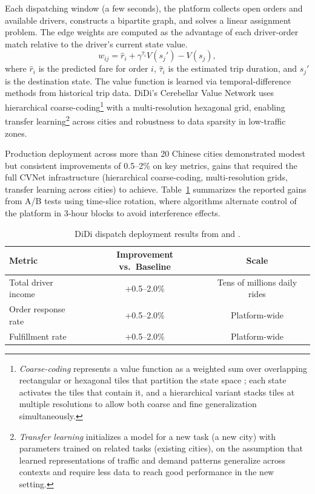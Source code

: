 Each dispatching window (a few seconds), the platform collects open orders and available drivers, constructs a bipartite graph, and solves a linear assignment problem. The edge weights are computed as the advantage of each driver-order match relative to the driver's current state value.
\begin{equation}
w_{ij} = \hat{r}_i + \gamma^{\hat{\tau}_i} V(s_j') - V(s_j),
\end{equation}
where $\hat{r}_i$ is the predicted fare for order $i$, $\hat{\tau}_i$ is the estimated trip duration, and $s_j'$ is the destination state. The value function is learned via temporal-difference methods from historical trip data. DiDi's Cerebellar Value Network \citep[CVNet;][]{Tang2019cvnet} uses hierarchical coarse-coding\footnote{\emph{Coarse-coding} represents a value function as a weighted sum over overlapping rectangular or hexagonal tiles that partition the state space \citep{sutton2018}; each state activates the tiles that contain it, and a hierarchical variant stacks tiles at multiple resolutions to allow both coarse and fine generalization simultaneously.} with a multi-resolution hexagonal grid, enabling transfer learning\footnote{\emph{Transfer learning} initializes a model for a new task (a new city) with parameters trained on related tasks (existing cities), on the assumption that learned representations of traffic and demand patterns generalize across contexts and require less data to reach good performance in the new setting.} across cities and robustness to data sparsity in low-traffic zones.

Production deployment across more than 20 Chinese cities demonstrated modest but consistent improvements of 0.5--2\% on key metrics, gains that required the full CVNet infrastructure (hierarchical coarse-coding, multi-resolution grids, transfer learning across cities) to achieve. Table~\ref{tab:didi_results} summarizes the reported gains from A/B tests using time-slice rotation, where algorithms alternate control of the platform in 3-hour blocks to avoid interference effects.

\begin{table}[htbp]
\centering
\caption{DiDi dispatch deployment results from \citet{Qin2021dispatch} and \citet{Tang2019cvnet}.}
\label{tab:didi_results}
\begin{tabular}{lcc}
\toprule
Metric & Improvement vs.\ Baseline & Scale \\
\midrule
Total driver income & +0.5--2.0\% & Tens of millions daily rides \\
Order response rate & +0.5--2.0\% & Platform-wide \\
Fulfillment rate & +0.5--2.0\% & Platform-wide \\
\bottomrule
\end{tabular}
\end{table}

